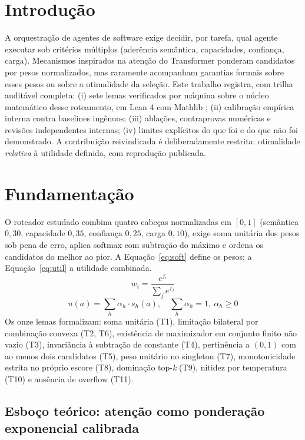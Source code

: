\documentclass[12pt,a4paper]{article}
\begin{document}
\section{Introdução}

A orquestração de agentes de software exige decidir, por tarefa, qual agente
executar sob critérios múltiplos (aderência semântica, capacidades,
confiança, carga). Mecanismos inspirados na atenção do Transformer
\cite{vaswani2017} ponderam candidatos por pesos normalizados, mas raramente
acompanham garantias formais sobre esses pesos ou sobre a otimalidade da
seleção. Este trabalho registra, com trilha auditável completa: (i) sete
lemas verificados por máquina sobre o núcleo matemático desse roteamento, em
Lean 4 com Mathlib \cite{moura2021,mathlib2020}; (ii) calibração empírica
interna contra baselines ingênuos; (iii) ablações, contraprovas numéricas e
revisões independentes internas; (iv) limites explícitos do que foi e do que
não foi demonstrado. A contribuição reivindicada é deliberadamente restrita:
otimalidade \textit{relativa} à utilidade definida, com reprodução publicada.

\section{Fundamentação}

O roteador estudado combina quatro cabeças normalizadas em $[0,1]$
(semântica $0{,}30$, capacidade $0{,}35$, confiança $0{,}25$, carga $0{,}10$),
exige soma unitária dos pesos sob pena de erro, aplica softmax com subtração
do máximo e ordena os candidatos do melhor ao pior. A Equação~\ref{eq:soft}
define os pesos; a Equação~\ref{eq:util} a utilidade combinada.
\begin{equation}
w_i = \frac{e^{f_i}}{\sum_j e^{f_j}} \label{eq:soft}
\end{equation}
\begin{equation}
u(a) = \sum_h \alpha_h \cdot s_h(a), \quad \sum_h \alpha_h = 1,\ \alpha_h \geq 0 \label{eq:util}
\end{equation}
Os onze lemas formalizam: soma unitária (T1), limitação bilateral por
combinação convexa (T2, T6), existência de maximizador em conjunto finito
não vazio (T3), invariância à subtração de constante (T4), pertinência a
$(0,1)$ com ao menos dois candidatos (T5), peso unitário no singleton (T7),
monotonicidade estrita no próprio escore (T8), dominação top-\textit{k} (T9),
nitidez por temperatura (T10) e ausência de overflow (T11).

\subsection{Esboço teórico: atenção como ponderação exponencial calibrada}
\end{document}
